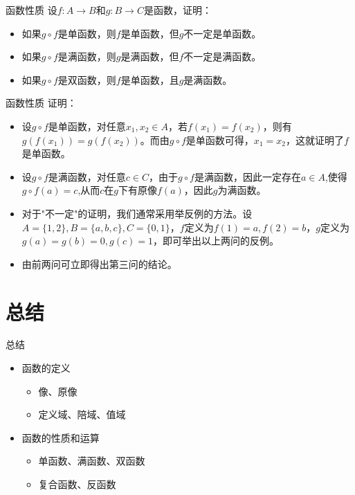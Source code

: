 \documentclass[10pt,aspectratio=43,mathserif,table]{beamer}
\begin{document}
\begin{frame}{函数性质}
	设$f:A\rightarrow B$和$g:B\rightarrow C$是函数，证明：
	\begin{itemize}
		\item<1-> 如果$g\circ f$是单函数，则$f$是单函数，但$g$不一定是单函数。
		\item<1-> 如果$g\circ f$是满函数，则$g$是满函数，但$f$不一定是满函数。
		\item<1-> 如果$g\circ f$是双函数，则$f$是单函数，且$g$是满函数。
	\end{itemize}
\end{frame}

\begin{frame}{函数性质}
	证明：
	\begin{itemize}
		\item<1-> 设$g\circ f$是单函数，对任意$x_{1},x_{2}\in A$，若$f(x_{1})=f(x_{2})$，则有$g(f(x_{1}))=g(f(x_{2}))$。而由$g\circ f$是单函数可得，$x_{1}=x_{2}$，这就证明了$f$是单函数。
		\item<2-> 设$g\circ f$是满函数，对任意$c\in C$，由于$g\circ f$是满函数，因此一定存在$a\in A$,使得$g\circ f(a)=c$,从而$c$在$g$下有原像$f(a)$，因此$g$为满函数。
		\item<3-> 对于"不一定"的证明，我们通常采用举反例的方法。设$A=\{1,2\},B=\{a,b,c\},C=\{0,1\}$，$f$定义为$f(1)=a,f(2)=b$，$g$定义为$g(a)=g(b)=0,g(c)=1$，即可举出以上两问的反例。
		\item<4-> 由前两问可立即得出第三问的结论。
	\end{itemize}
\end{frame}

\section{总结}

\begin{frame}{总结}
	\begin{itemize}
		\item<1-> 函数的定义
		\begin{itemize}
			\item<1-> 像、原像
			\item<1-> 定义域、陪域、值域
		\end{itemize}
		\item <1-> 函数的性质和运算
		\begin{itemize}
			\item<1-> 单函数、满函数、双函数
			\item<1-> 复合函数、反函数
		\end{itemize}
	\end{itemize}
\end{frame}
\end{document}
